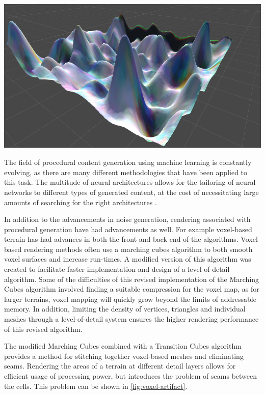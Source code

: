 \documentclass[10pt]{report}
\begin{document}
		\begin{minipage}{\textwidth}
			\centering
			\includegraphics[scale=.3]{rolling}
			\label{fig:dl-noise}
		\end{minipage}
	
		The field of procedural content generation using machine learning is constantly evolving, as there are many different methodologies that have been applied to this task. The multitude of neural architectures allows for the tailoring of neural networks to different types of generated content, at the cost of necessitating large amounts of searching for the right architectures \cite{Liu_2020}.
		
		In addition to the advancements in noise generation, rendering associated with procedural generation have had advancements as well. For example voxel-based terrain has had advances in both the front and back-end of the algorithms. Voxel-based rendering methods often use a marching cubes algorithm to both smooth voxel surfaces and increase run-times. A modified version of this algorithm was created to facilitate faster implementation and design of a level-of-detail algorithm. Some of the difficulties of this revised implementation of the Marching Cubes algorithm involved finding a suitable compression for the voxel map, as for larger terrains, voxel mapping will quickly grow beyond the limits of addressable memory. In addition, limiting the density of vertices, triangles and individual meshes through a level-of-detail system ensures the higher rendering performance of this revised algorithm. 
		
		The modified Marching Cubes combined with a Transition Cubes algorithm provides a method for stitching together voxel-based meshes and eliminating seams. Rendering the areas of a terrain at different detail layers allows for efficient usage of processing power, but introduces the problem of seams between the cells. This problem can be shown in \autoref{fig:voxel-artifact}. 
		
\end{document}

